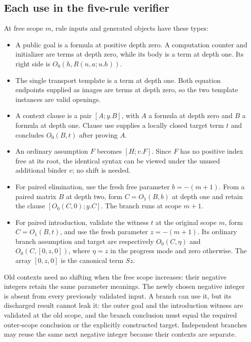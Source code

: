\subsection{Each use in the five-rule verifier}

At free scope $m$, rule inputs and generated objects have these types:
\begin{itemize}
\item A public goal is a formula at positive depth zero. A computation
counter and initializer are terms at depth zero, while its body is a
term at depth one. Its right side is $O_0(h,R(n,a;u.h))$.
\item The single transport template is a term at depth one. Both
equation endpoints supplied as images are terms at depth zero, so
the two template instances are valid openings.
\item A context clause is a pair $[A;y.B]$, with $A$ a formula at depth
zero and $B$ a formula at depth one. Clause use supplies a locally
closed target term $t$ and concludes $O_0(B,t)$ after proving $A$.
\item An ordinary assumption $F$ becomes $[H;v.F]$. Since $F$ has no
positive index free at its root, the identical syntax can be viewed
under the unused additional binder $v$; no shift is needed.
\item For paired elimination, use the fresh free parameter
$b=-(m+1)$. From a paired matrix $B$ at depth two, form
$C=O_1(B,b)$ at depth one and retain the clause $[O_0(C,0);y.C]$.
The branch runs at scope $m+1$.
\item For paired introduction, validate the witness $t$ at the original
scope $m$, form $C=O_1(B,t)$, and use the fresh parameter
$z=-(m+1)$. Its ordinary branch assumption and target are respectively
$O_0(C,\eta)$ and $O_0(C,[0,z,0])$, where $\eta=z$ in the progress
mode and zero otherwise. The array $[0,z,0]$ is the canonical term
$Sz$.
\end{itemize}

Old contexts need no shifting when the free scope increases: their
negative integers retain the same parameter meanings. The newly chosen
negative integer is absent from every previously validated input. A
branch can use it, but its discharged result cannot leak it: the outer
goal and the introduction witness are validated at the old scope, and
the branch conclusion must equal the required outer-scope conclusion
or the explicitly constructed target. Independent branches may reuse
the same next negative integer because their contexts are separate.

